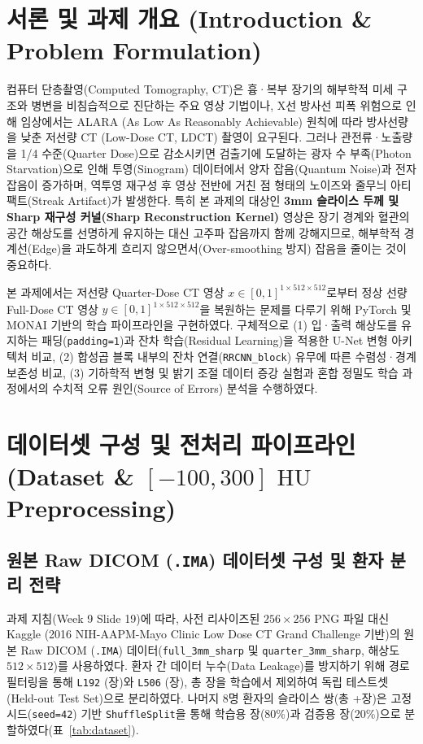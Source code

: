 \documentclass[10pt,a4paper]{article}
\begin{document}
\section{서론 및 과제 개요 (Introduction \& Problem Formulation)}

컴퓨터 단층촬영(Computed Tomography, CT)은 흉·복부 장기의 해부학적 미세 구조와 병변을 비침습적으로 진단하는 주요 영상 기법이나, X선 방사선 피폭 위험으로 인해 임상에서는 ALARA (As Low As Reasonably Achievable) 원칙에 따라 방사선량을 낮춘 저선량 CT (Low-Dose CT, LDCT) 촬영이 요구된다. 그러나 관전류·노출량을 1/4 수준(Quarter Dose)으로 감소시키면 검출기에 도달하는 광자 수 부족(Photon Starvation)으로 인해 투영(Sinogram) 데이터에서 양자 잡음(Quantum Noise)과 전자 잡음이 증가하며, 역투영 재구성 후 영상 전반에 거친 점 형태의 노이즈와 줄무늬 아티팩트(Streak Artifact)가 발생한다. 특히 본 과제의 대상인 \textbf{3mm 슬라이스 두께 및 Sharp 재구성 커널(Sharp Reconstruction Kernel)} 영상은 장기 경계와 혈관의 공간 해상도를 선명하게 유지하는 대신 고주파 잡음까지 함께 강해지므로, 해부학적 경계선(Edge)을 과도하게 흐리지 않으면서(Over-smoothing 방지) 잡음을 줄이는 것이 중요하다.

본 과제에서는 저선량 Quarter-Dose CT 영상 $x \in [0, 1]^{1\times 512\times 512}$로부터 정상 선량 Full-Dose CT 영상 $y \in [0, 1]^{1\times 512\times 512}$을 복원하는 문제를 다루기 위해 PyTorch 및 MONAI 기반의 학습 파이프라인을 구현하였다. 구체적으로 (1) 입·출력 해상도를 유지하는 패딩(\texttt{padding=1})과 잔차 학습(Residual Learning)을 적용한 U-Net 변형 아키텍처 비교, (2) 합성곱 블록 내부의 잔차 연결(\texttt{RRCNN\_block}) 유무에 따른 수렴성·경계 보존성 비교, (3) 기하학적 변형 및 밝기 조절 데이터 증강 실험과 혼합 정밀도 학습 과정에서의 수치적 오류 원인(Source of Errors) 분석을 수행하였다.

\section{데이터셋 구성 및 전처리 파이프라인 (Dataset \& $[-100, 300]\text{ HU}$ Preprocessing)}

\subsection{원본 Raw DICOM (\texttt{.IMA}) 데이터셋 구성 및 환자 분리 전략}
과제 지침(Week 9 Slide 19)에 따라, 사전 리사이즈된 $256\times 256$ PNG 파일 대신 Kaggle (2016 NIH-AAPM-Mayo Clinic Low Dose CT Grand Challenge 기반)의 원본 Raw DICOM (\texttt{.IMA}) 데이터(\texttt{full\_3mm\_sharp} 및 \texttt{quarter\_3mm\_sharp}, 해상도 $512\times 512$)를 사용하였다. 환자 간 데이터 누수(Data Leakage)를 방지하기 위해 경로 필터링을 통해 \texttt{L192} (\TestLOneSlices 장)와 \texttt{L506} (\TestLFiveSlices 장), 총 \TestSlices 장을 학습에서 제외하여 독립 테스트셋(Held-out Test Set)으로 분리하였다. 나머지 8명 환자의 슬라이스 쌍(총 \the\numexpr\TrainSlices+\ValSlices\relax 장)은 고정 시드(\texttt{seed=42}) 기반 \texttt{ShuffleSplit}을 통해 학습용 \TrainSlices 장(80\%)과 검증용 \ValSlices 장(20\%)으로 분할하였다(표~\ref{tab:dataset}).
\end{document}
